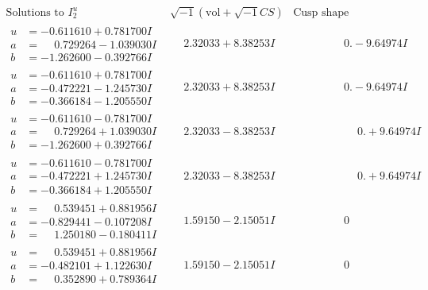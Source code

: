 \documentclass[1p]{elsarticle_modified}
\theoremstyle{definition}
\newcommand{\I}{\sqrt{-1}}
\begin{document}
$$\begin{array}{c|c|c}  
\text{Solutions to }I^u_{2}& \I (\text{vol} + \sqrt{-1}CS) & \text{Cusp shape}\\
 \hline 
\begin{aligned}
u &= -0.611610 + 0.781700 I \\
a &= \phantom{-}0.729264 - 1.039030 I \\
b &= -1.262600 - 0.392766 I\end{aligned}
 & \phantom{-}2.32033 + 8.38253 I & \phantom{-0.000000 } 0. - 9.64974 I \\ \hline\begin{aligned}
u &= -0.611610 + 0.781700 I \\
a &= -0.472221 - 1.245730 I \\
b &= -0.366184 - 1.205550 I\end{aligned}
 & \phantom{-}2.32033 + 8.38253 I & \phantom{-0.000000 } 0. - 9.64974 I \\ \hline\begin{aligned}
u &= -0.611610 - 0.781700 I \\
a &= \phantom{-}0.729264 + 1.039030 I \\
b &= -1.262600 + 0.392766 I\end{aligned}
 & \phantom{-}2.32033 - 8.38253 I & \phantom{-0.000000 -}0. + 9.64974 I \\ \hline\begin{aligned}
u &= -0.611610 - 0.781700 I \\
a &= -0.472221 + 1.245730 I \\
b &= -0.366184 + 1.205550 I\end{aligned}
 & \phantom{-}2.32033 - 8.38253 I & \phantom{-0.000000 -}0. + 9.64974 I \\ \hline\begin{aligned}
u &= \phantom{-}0.539451 + 0.881956 I \\
a &= -0.829441 - 0.107208 I \\
b &= \phantom{-}1.250180 - 0.180411 I\end{aligned}
 & \phantom{-}1.59150 - 2.15051 I & \phantom{-0.000000 } 0 \\ \hline\begin{aligned}
u &= \phantom{-}0.539451 + 0.881956 I \\
a &= -0.482101 + 1.122630 I \\
b &= \phantom{-}0.352890 + 0.789364 I\end{aligned}
 & \phantom{-}1.59150 - 2.15051 I & \phantom{-0.000000 } 0 \\ \hline\begin{aligned}

\end{aligned}
\end{array}$$
\end{document}
